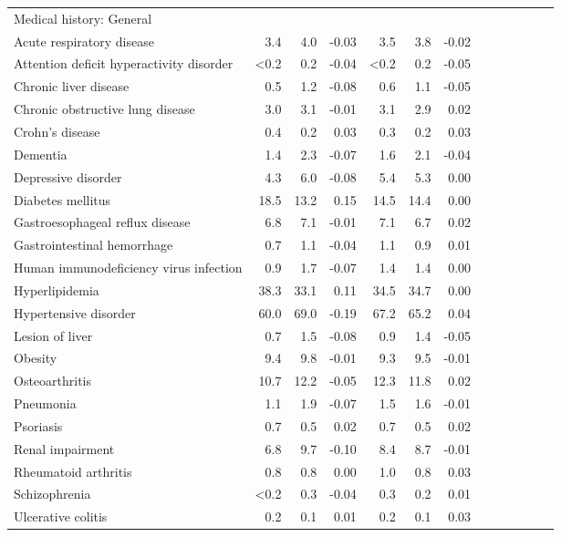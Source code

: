 \documentclass[11pt,]{article}
\begin{document}
\begin{longtable}{lrrrrrrrrrrrr}
  Medical history: General &    &    &     &    &    &     \\ 
      Acute respiratory disease &  3.4 &  4.0 & -0.03 &  3.5 &  3.8 & -0.02 \\ 
      Attention deficit hyperactivity disorder & <0.2 &  0.2 & -0.04 & <0.2 &  0.2 & -0.05 \\ 
      Chronic liver disease &  0.5 &  1.2 & -0.08 &  0.6 &  1.1 & -0.05 \\ 
      Chronic obstructive lung disease &  3.0 &  3.1 & -0.01 &  3.1 &  2.9 &  0.02 \\ 
      Crohn's disease &  0.4 &  0.2 &  0.03 &  0.3 &  0.2 &  0.03 \\ 
      Dementia &  1.4 &  2.3 & -0.07 &  1.6 &  2.1 & -0.04 \\ 
      Depressive disorder &  4.3 &  6.0 & -0.08 &  5.4 &  5.3 &  0.00 \\ 
      Diabetes mellitus & 18.5 & 13.2 &  0.15 & 14.5 & 14.4 &  0.00 \\ 
      Gastroesophageal reflux disease &  6.8 &  7.1 & -0.01 &  7.1 &  6.7 &  0.02 \\ 
      Gastrointestinal hemorrhage &  0.7 &  1.1 & -0.04 &  1.1 &  0.9 &  0.01 \\ 
      Human immunodeficiency virus infection &  0.9 &  1.7 & -0.07 &  1.4 &  1.4 &  0.00 \\ 
      Hyperlipidemia & 38.3 & 33.1 &  0.11 & 34.5 & 34.7 &  0.00 \\ 
      Hypertensive disorder & 60.0 & 69.0 & -0.19 & 67.2 & 65.2 &  0.04 \\ 
      Lesion of liver &  0.7 &  1.5 & -0.08 &  0.9 &  1.4 & -0.05 \\ 
      Obesity &  9.4 &  9.8 & -0.01 &  9.3 &  9.5 & -0.01 \\ 
      Osteoarthritis & 10.7 & 12.2 & -0.05 & 12.3 & 11.8 &  0.02 \\ 
      Pneumonia &  1.1 &  1.9 & -0.07 &  1.5 &  1.6 & -0.01 \\ 
      Psoriasis &  0.7 &  0.5 &  0.02 &  0.7 &  0.5 &  0.02 \\ 
      Renal impairment &  6.8 &  9.7 & -0.10 &  8.4 &  8.7 & -0.01 \\ 
      Rheumatoid arthritis &  0.8 &  0.8 &  0.00 &  1.0 &  0.8 &  0.03 \\ 
      Schizophrenia & <0.2 &  0.3 & -0.04 &  0.3 &  0.2 &  0.01 \\ 
      Ulcerative colitis &  0.2 &  0.1 &  0.01 &  0.2 &  0.1 &  0.03 \\ 

\end{longtable}
\end{document}
